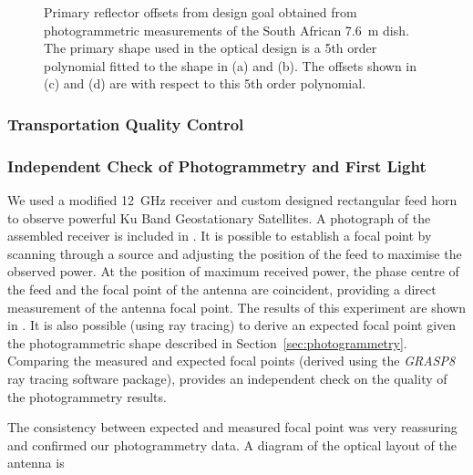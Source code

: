 \begin{figure}
 \caption{Primary reflector offsets from design goal obtained from photogrammetric measurements of the South African 7.6~m dish. The primary shape used in the optical design is a 5th order polynomial fitted to the shape in (a) and (b). The offsets shown in (c) and (d) are with respect to this 5th order polynomial.}
 \label{fig:dish_surface}
\end{figure}



    \subsubsection{Transportation Quality Control}

\subsubsection{Independent Check of Photogrammetry and First Light}
\label{sec:first_light}
We used a modified 12~GHz receiver and custom designed rectangular feed horn \cite{meeks_1976} to observe powerful Ku Band Geostationary Satellites. A photograph of the assembled receiver is included in . It is possible to establish a focal point by scanning through a source and adjusting the position of the feed to maximise the observed power. At the position of maximum received power, the phase centre of the feed and the focal point of the antenna are coincident, providing a direct measurement of the antenna focal point. The results of this experiment are shown in . It is also possible (using ray tracing) to derive an expected focal point given the photogrammetric shape described in Section~\ref{sec:photogrammetry}. Comparing the measured and expected focal points (derived using the \textit{GRASP8} ray tracing software package), provides an independent check on the quality of the photogrammetry results.  

 The consistency between expected and measured focal point was very reassuring and confirmed our photogrammetry data. A diagram of the optical layout of the antenna is 

